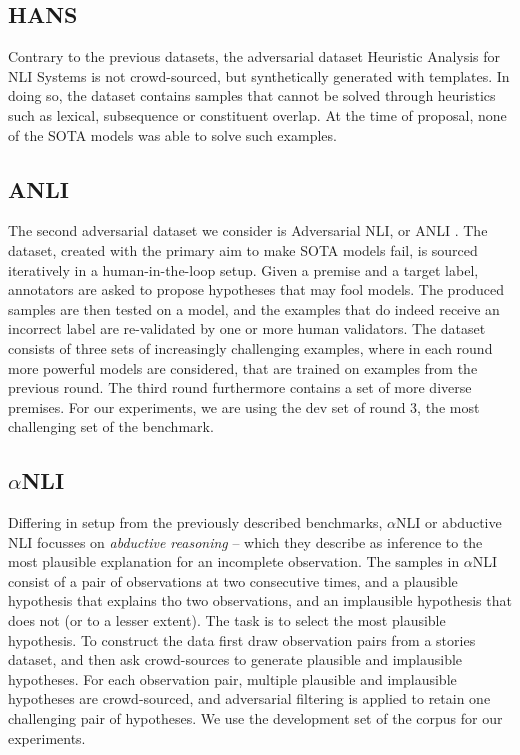 \subsection{HANS}
Contrary to the previous datasets, the adversarial dataset Heuristic Analysis for NLI Systems \citep[HANS,][]{mccoy-etal-2019-right} is not crowd-sourced, but synthetically generated with templates.
In doing so, the dataset contains samples that cannot be solved through heuristics such as lexical, subsequence or constituent overlap.
At the time of proposal, none of the SOTA models was able to solve such examples.

\subsection{ANLI}
The second adversarial dataset we consider is Adversarial NLI, or ANLI \citep{nie-etal-2020-adversarial}.
The dataset, created with the primary aim to make SOTA models fail, is sourced iteratively in a human-in-the-loop setup.
Given a premise and a target label, annotators are asked to propose hypotheses that may fool models.
The produced samples are then tested on a model, and the examples that do indeed receive an incorrect label are re-validated by one or more human validators.
The dataset consists of three sets of increasingly challenging examples, where in each round more powerful models are considered, that are trained on examples from the previous round.
The third round furthermore contains a set of more diverse premises.
For our experiments, we are using the dev set of round 3, the most challenging set of the benchmark.

\subsection{$\alpha$NLI}
Differing in setup from the previously described benchmarks, $\alpha$NLI or abductive NLI \citep{bhagavatula2020abductive} focusses on \emph{abductive reasoning} -- which they describe as inference to the most plausible explanation for an incomplete observation.
The samples in $\alpha$NLI consist of a pair of observations at two consecutive times, and a plausible hypothesis that explains tho two observations, and an implausible hypothesis that does not (or to a lesser extent).
The task is to select the most plausible hypothesis.
To construct the data \citet{bhagavatula2020abductive} first draw observation pairs from a stories dataset, and then ask crowd-sources to generate plausible and implausible hypotheses. 
For each observation pair, multiple plausible and implausible hypotheses are crowd-sourced, and adversarial filtering is applied to retain one challenging pair of hypotheses.
We use the development set of the corpus for our experiments.


